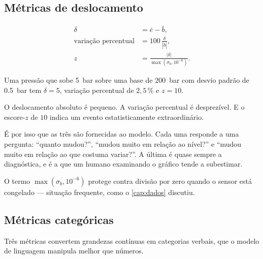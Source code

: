 \subsection{Métricas de deslocamento}

\begin{align}
  \delta &= \bar{e} - \bar{b}, \label{eq:ag-delta} \\
  \text{variação percentual} &= 100 \, \frac{\delta}{|\bar{b}|}, \label{eq:ag-pct} \\
  z &= \frac{|\delta|}{\max(\sigma_b, 10^{-6})}. \label{eq:ag-z}
\end{align}

\begin{destaque}
Uma pressão que sobe \SI{5}{\bar} sobre uma base de \SI{200}{\bar} com desvio padrão de
\SI{0,5}{\bar} tem $\delta = 5$, variação percentual de $2{,}5\,\%$ e $z = 10$.

O deslocamento absoluto é pequeno. A variação percentual é desprezível. E o escore-$z$
de $10$ indica um evento estatisticamente extraordinário.

É por isso que as três são fornecidas ao modelo. Cada uma responde a uma pergunta:
``quanto mudou?'', ``mudou muito em relação ao nível?'' e ``mudou muito em relação ao
que costuma variar?''. A última é quase sempre a diagnóstica, e é a que um humano
examinando o gráfico tende a subestimar.

O termo $\max(\sigma_b, 10^{-6})$ protege contra divisão por zero quando o sensor está
congelado --- situação frequente, como o \cref{cap:dados} discutiu.
\end{destaque}

\subsection{Métricas categóricas}

Três métricas convertem grandezas contínuas em categorias verbais, que o modelo de
linguagem manipula melhor que números.

